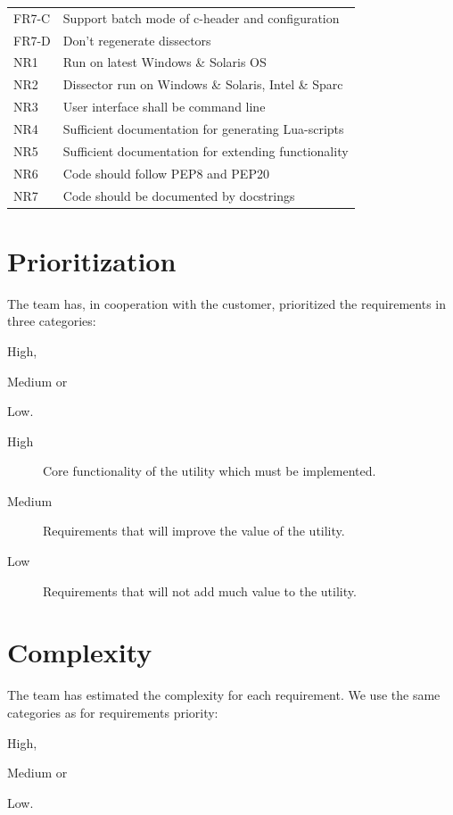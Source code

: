 \begin{table}[H]
\begin{tabular}{l l}
	FR7-C & Support batch mode of c-header and configuration \\
	FR7-D & Don't regenerate dissectors \\
	\addlinespace
	NR1 & Run on latest Windows \& Solaris OS \\
	NR2 & Dissector run on Windows \& Solaris, Intel \& Sparc \\
	NR3 & User interface shall be command line \\
	NR4 & Sufficient documentation for generating Lua-scripts \\
	NR5 & Sufficient documentation for extending functionality \\
	NR6 & Code should follow PEP8 and PEP20 \\
	NR7 & Code should be documented by docstrings \\
	\bottomrule
\end{tabular}
\end{table}

\section{Prioritization}
\label{sec:reqspriority}
The team has, in cooperation with the customer, prioritized the requirements
in three categories:
\begin{inparaenum}
	\item High,
	\item Medium or
	\item Low.
\end{inparaenum} 

\begin{description}
	\item[High] Core functionality of the utility which must be implemented.
	\item[Medium] Requirements that will improve the value of the utility.
	\item[Low] Requirements that will not add much value to the utility.
\end{description}

\section{Complexity}
\label{sec:reqscompl}
The team has estimated the complexity for each requirement. We use the same
categories as for requirements priority:
\begin{inparaenum}
	\item High,
	\item Medium or
	\item Low.
\end{inparaenum} 

